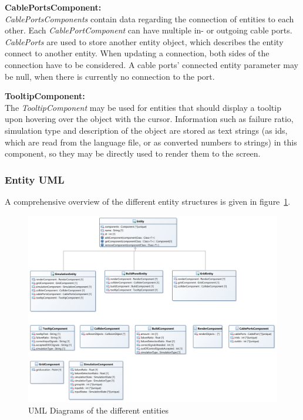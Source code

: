 \textbf{CablePortsComponent:} \\
\textit{CablePortsComponents} contain data regarding the connection of entities to each other.
Each \textit{CablePortComponent} can have multiple in- or outgoing cable ports.
\textit{CablePorts} are used to store another entity object, which describes the entity connect to another entity.
When updating a connection, both sides of the connection have to be considered.
A cable ports' connected entity parameter may be null, when there is currently no connection to the port.

\textbf{TooltipComponent:} \\
The \textit{TooltipComponent} may be used for entities that should display a tooltip upon hovering over the object with the cursor.
Information such as failure ratio, simulation type and description of the object are stored as text strings (as ids, which are read
from the language file, or as converted numbers to strings) in this component, so they may be directly used to render them to
the screen.
\subsubsection{Entity UML}\label{subsubsec:entity-uml}
A comprehensive overview of the different entity structures is given in figure~\ref{fig:entities}.
\begin{figure}
    \centering
    \includegraphics[width=\textwidth]{Pictures/res/implementation/entities}
    \caption{UML Diagrams of the different entities}
    \label{fig:entities}
\end{figure}
